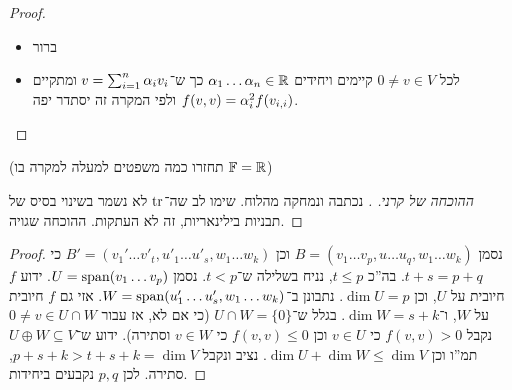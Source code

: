 \documentclass[]{../../../../tex/classes/styledArticle}
\begin{document}
    \begin{proof}\,
        \begin{itemize}
            \item[$\impliedby$] ברור
            \item לכל $0 \neq v \in V$ קיימים ויחידים $\alpha_1 \dots \alpha_n \in \mathbb{R}$ כך ש־$v = \sum^n_{i = 1} \alpha_i v_i$ ומתקיים $f(v, v) = \alpha_i^2 f(v_{i, i})$ ולפי המקרה זה יסתדר יפה. 
        \end{itemize}
    \end{proof}
    
    (תחזרו כמה משפטים למעלה למקרה בו $\mathbb{F} = \mathbb{R}$)
    \begin{proof}[ההוכחה של קרני. ]
        נכתבה ונמחקה מהלוח. שימו לב שה־$\operatorname{tr}$ לא נשמר בשינוי בסיס של תבניות בילינאריות, זה לא העתקות. ההוכחה שגויה. 
    \end{proof}
    \begin{proof}
        נסמן $B = (v_1 \dots v_p, u \dots u_q, w_1 \dots w_k)$ וכן $B' = (v_1' \dots v'_t, u'_1 \dots u'_s, w_1 \dots w_k)$ כי $t + s = p + q$. בה''כ $t \le p$, נניח בשלילה ש־$t < p$. נסמן $U = \operatorname{span}(v_1 \dots v_p)$. ידוע $f$ חיובית על $U$, וכן $\dim U = p$. נתבונן ב־$W = \operatorname{span}(u_1' \dots u_s', w_1 \dots w_k)$. אזי גם $f$ חיובית על $W$, ו־$\dim W = s + k$. בגלל ש־$U \cap W = \{0\}$ (כי אם לא, אז עבור $0 \neq v \in U \cap W$ נקבל $f(v, v) > 0$ כי $v \in U$ וכן $f(v, v) \le 0$ כי $v \in W$ וסתירה). ידוע ש־$U \oplus W \subseteq V$ תמ''ו וכן $\dim U + \dim W \le \dim V$. נציב ונקבל $p + s + k > t + s + k = \dim V$, סתירה. לכן $p, q$ נקבעים ביחידות. 
    \end{proof}
    
    
    \section{}
\end{document}
